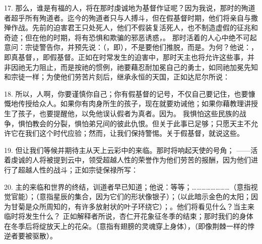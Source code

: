 17. 那么，谁是有福的人，将在那时虔诚地为基督作证呢？因为我说，那时的殉道者超乎所有殉道者。迄今的殉道者只与人搏斗，但在假基督时期，他们将亲自与撒殚作战。先前的迫害君王只处死人，他们不假装复活死人，也不制造虚假的征兆和奇迹；但在他的时期，将有恐惧和欺骗的邪恶诱惑，。 那时活着的人心中绝不可起意问：宗徒警告你，并预先说：（，即），不是要他们推脱，而是。为何？他说：，即真基督，，即假基督。正如在时常发生的迫害中，那时天主也将允许这些事，并非因祂无力阻止，而是按祂的惯例，祂要藉忍耐加冕自己的勇士，如同祂加冕先知和宗徒一样；为使他们劳苦片刻后，继承永恒的天国，正如达尼尔所说：\par

18. 所以，人啊，你要谨慎你自己；你有假基督的记号，不仅自己要记住，也要慷慨地传授给众人。如果你有肉身所生的孩子，现在就要劝诫他；如果你藉教理讲授生了孩子，也要提醒他，以免他误认假者为真者。因为。 我惧怕这些民族的战争，惧怕教会的分裂，惧怕弟兄间的彼此仇恨。但关于此事已足够；只愿天主不允许它在我们这个时代应验；然而，让我们保持警惕。关于假基督，就说这些。\par

19. 但让我们等候并期待主从天上云彩中的来临。那时将响起天使的号角； ——活着虔诚的人将被提到云中，领受超越人性的荣誉作为他们劳苦的报酬，因为他们进行了超越人性的战斗；正如宗徒保禄所写：\par

20. 主的来临和世界的终结，训道者早已知道；他说：等等；……………………（意指视觉官能）；（意指星辰的集合，因为它们的形状像银子）；（以此暗示金色的太阳；因为甘菊是众所周知的，有许多放射状的叶子环绕它）；。他们将看见什么？当主来临时将发生什么？ 正如解释者所说，杏仁开花象征冬季的结束；那时我们的身体在冬季后将绽放天上的花朵。（意指有翅膀的灵魂穿上身体），（即像荆棘一样的悖逆者要被驱散）。\par

